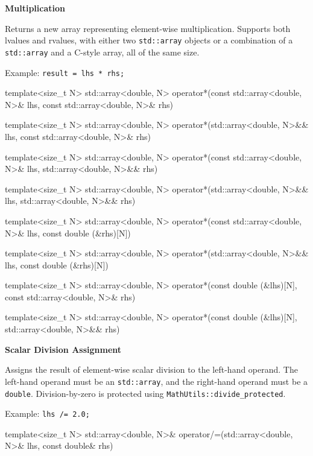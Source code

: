 \documentclass[11pt,fleqn]{report}
\begin{document}
\textbf{Multiplication}  

Returns a new array representing element-wise multiplication.  
Supports both lvalues and rvalues, with either two \texttt{std::array} objects or
a combination of a \texttt{std::array} and a C-style array, all of the same size.

Example: \texttt{result = lhs * rhs;}  
\begin{code}
template<size_t N>
std::array<double, N> operator*(const std::array<double, N>& lhs, 
                                const std::array<double, N>& rhs)

template<size_t N>
std::array<double, N> operator*(std::array<double, N>&& lhs, 
                                const std::array<double, N>& rhs)

template<size_t N>
std::array<double, N> operator*(const std::array<double, N>& lhs, 
                                std::array<double, N>&& rhs)

template<size_t N>
std::array<double, N> operator*(std::array<double, N>&& lhs, 
                                std::array<double, N>&& rhs)

template<size_t N>
std::array<double, N> operator*(const std::array<double, N>& lhs, 
                                const double (&rhs)[N])

template<size_t N>
std::array<double, N> operator*(std::array<double, N>&& lhs, 
                                const double (&rhs)[N])

template<size_t N>
std::array<double, N> operator*(const double (&lhs)[N], 
                                const std::array<double, N>& rhs)

template<size_t N>
std::array<double, N> operator*(const double (&lhs)[N], 
                                std::array<double, N>&& rhs)
\end{code}

\textbf{Scalar Division Assignment}  

Assigns the result of element-wise scalar division to the left-hand operand.
The left-hand operand must be an \texttt{std::array}, and the right-hand 
operand must be a \texttt{double}. 
Division-by-zero is protected using \texttt{MathUtils::divide\_protected}.  

Example: \texttt{lhs /= 2.0;}  
\begin{code}
template<size_t N>
std::array<double, N>& operator/=(std::array<double, N>& lhs, 
                                  const double& rhs)
\end{code}
\end{document}
